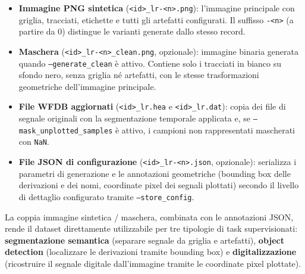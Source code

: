 \begin{itemize}
    \item \textbf{Immagine PNG sintetica} (\texttt{<id>\_lr-<n>.png}): l'immagine principale con griglia, tracciati, etichette e tutti gli artefatti configurati. Il suffisso \texttt{-<n>} (a partire da 0) distingue le varianti generate dallo stesso record.
    \item \textbf{Maschera} (\texttt{<id>\_lr-<n>\_clean.png}, opzionale): immagine binaria generata quando \texttt{--generate\_clean} è attivo. Contiene solo i tracciati in bianco su sfondo nero, senza griglia né artefatti, con le stesse trasformazioni geometriche dell'immagine principale.
    \item \textbf{File WFDB aggiornati} (\texttt{<id>\_lr.hea} e \texttt{<id>\_lr.dat}): copia dei file di segnale originali con la segmentazione temporale applicata e, se \texttt{--mask\_unplotted\_samples} è attivo, i campioni non rappresentati mascherati con \texttt{NaN}.
    \item \textbf{File JSON di configurazione} (\texttt{<id>\_lr-<n>.json}, opzionale): serializza i parametri di generazione e le annotazioni geometriche (bounding box delle derivazioni e dei nomi, coordinate pixel dei segnali plottati) secondo il livello di dettaglio configurato tramite \texttt{--store\_config}.
\end{itemize}

\vspace{4mm}
La coppia immagine sintetica / maschera, combinata con le annotazioni JSON, rende il dataset direttamente utilizzabile per tre tipologie di task supervisionati: \textbf{segmentazione semantica} (separare segnale da griglia e artefatti), \textbf{object detection} (localizzare le derivazioni tramite bounding box) e \textbf{digitalizzazione} (ricostruire il segnale digitale dall'immagine tramite le coordinate pixel plottate).